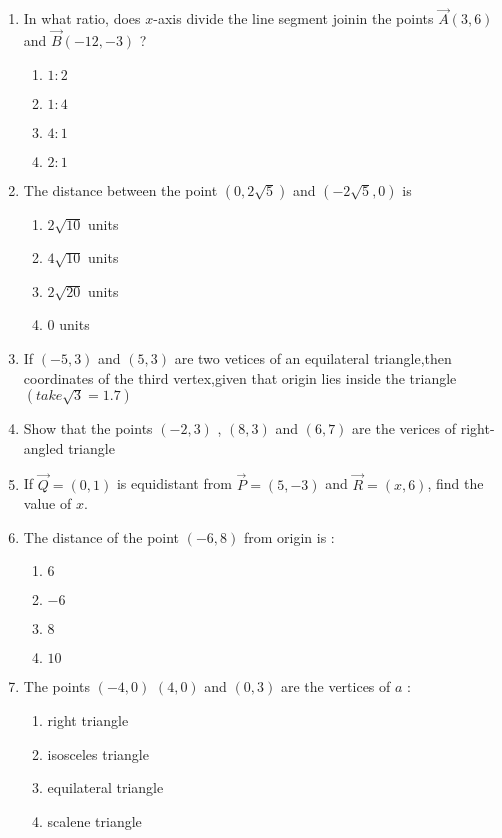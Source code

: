 \begin{enumerate}[label=\thesection.\arabic*,ref=\thesection.\theenumi]
\item In what ratio, does $x$-axis divide the line segment joinin the points $\vec{A}(3,6)$ and $\vec{B}(-12, -3)$ ?
\begin{enumerate}
\item $1:2$
\item $1:4$
\item $4:1$ 
\item $2:1$
\end{enumerate}

\item The distance between the point $(0,2\sqrt{5})$ and $(-2\sqrt{5},0)$ is 
\begin{enumerate}
\item $2\sqrt{10}$ units
\item $4\sqrt{10}$ units
\item $2\sqrt{20}$ units
\item $0$ units
\end{enumerate}

\item If $(-5,3)$ and $(5,3)$ are two vetices of an equilateral triangle,then coordinates of the third vertex,given that origin lies inside the triangle $(take \sqrt{3}=1.7)$
\item Show that the points $(-2,3)$ , $(8,3)$ and $(6,7)$ are the verices of right-angled triangle
\item If $\vec{Q} =(0,1)$ is equidistant from $\vec{P} = (5,-3)$ and $\vec{R} =(x,6)$, find the value of $x$.
\item The distance of the point $(-6,8)$ from origin is :
\begin{enumerate}
\item $6$
\item $-6$
\item $8$
\item $10$
\end{enumerate}

\item The points $(-4,0)$ $(4,0)$ and $(0,3)$ are the vertices of $a$ :
\begin{enumerate}
\item right triangle
\item isosceles triangle
\item equilateral triangle
\item scalene triangle
\end{enumerate}
\end{enumerate}

